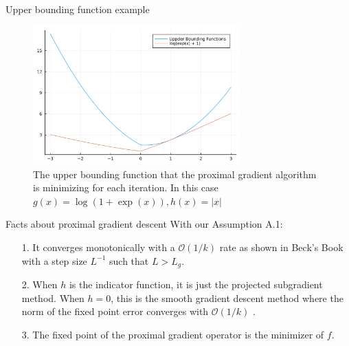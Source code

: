 \documentclass[11pt]{beamer}
\begin{document}
        \begin{frame}{Upper bounding function example}
            \begin{figure}[h]
                \centering
                \includegraphics[width=8cm]{the_upperbounding_fxn.png}
                \caption{The upper bounding function that the proximal gradient algorithm is minimizing for each iteration. In this case $g(x) = \log(1 + \exp(x)), h(x) = |x|$}
            \end{figure}
        \end{frame}
        \begin{frame}{Facts about proximal gradient descent}
            With our Assumption A.1: 
            \begin{itemize}
                \item [1.] It converges monotonically with a $\mathcal O(1/k)$ rate as shown in Beck's Book \cite{book:first_order_opt} with a step size $L^{-1}$ such that $L > L_g$. 
                \item [2.] When $h$ is the indicator function, it is just the projected subgradient method. When $h = 0$, this is the smooth gradient descent method where the norm of the fixed point error converges with $\mathcal O(1/k)$ \cite{book:first_order_opt}. 
                \item [3.] The fixed point of the proximal gradient operator is the minimizer of $f$. 
            \end{itemize}
        \end{frame}
\end{document}
